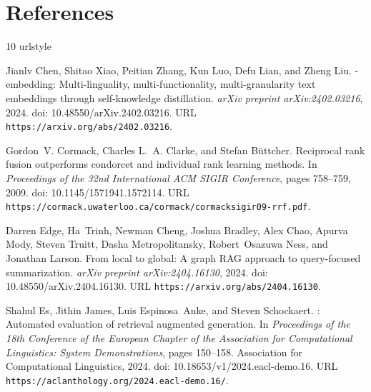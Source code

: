 \documentclass[11pt,a4paper,oneside]{report}
\begin{document}
\chapter{References}
\begingroup
\renewcommand{\bibsection}{}
\small\setlength{\bibsep}{5pt}
\begin{thebibliography}{10}
\providecommand{\natexlab}[1]{#1}
\providecommand{\url}[1]{\texttt{#1}}
\expandafter\ifx\csname urlstyle\endcsname\relax
  \providecommand{\doi}[1]{doi: #1}\else
  \providecommand{\doi}{doi: \begingroup \urlstyle{rm}\Url}\fi

Jianlv Chen, Shitao Xiao, Peitian Zhang, Kun Luo, Defu Lian, and Zheng Liu.
-embedding: Multi-linguality, multi-functionality,
  multi-granularity text embeddings through self-knowledge distillation.
\newblock \emph{arXiv preprint arXiv:2402.03216}, 2024.
\newblock \doi{10.48550/arXiv.2402.03216}.
\newblock URL \url{https://arxiv.org/abs/2402.03216}.

Gordon~V. Cormack, Charles L.~A. Clarke, and Stefan B{\"u}ttcher.
\newblock Reciprocal rank fusion outperforms condorcet and individual rank
  learning methods.
\newblock In \emph{Proceedings of the 32nd International ACM SIGIR Conference},
  pages 758--759, 2009.
\newblock \doi{10.1145/1571941.1572114}.
\newblock URL
  \url{https://cormack.uwaterloo.ca/cormack/cormacksigir09-rrf.pdf}.

Darren Edge, Ha~Trinh, Newman Cheng, Joshua Bradley, Alex Chao, Apurva Mody,
  Steven Truitt, Dasha Metropolitansky, Robert~Osazuwa Ness, and Jonathan
  Larson.
\newblock From local to global: A graph {RAG} approach to query-focused
  summarization.
\newblock \emph{arXiv preprint arXiv:2404.16130}, 2024.
\newblock \doi{10.48550/arXiv.2404.16130}.
\newblock URL \url{https://arxiv.org/abs/2404.16130}.

Shahul Es, Jithin James, Luis Espinosa~Anke, and Steven Schockaert.
: Automated evaluation of retrieval augmented generation.
\newblock In \emph{Proceedings of the 18th Conference of the European Chapter
  of the Association for Computational Linguistics: System Demonstrations},
  pages 150--158. Association for Computational Linguistics, 2024.
\newblock \doi{10.18653/v1/2024.eacl-demo.16}.
\newblock URL \url{https://aclanthology.org/2024.eacl-demo.16/}.


\end{thebibliography}
\end{document}
